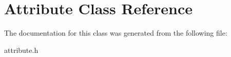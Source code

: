 \hypertarget{classAttribute}{\section{\-Attribute \-Class \-Reference}
\label{classAttribute}
}


\-The documentation for this class was generated from the following file\-:\begin{DoxyCompactItemize}
\item 
attribute.\-h\end{DoxyCompactItemize}
